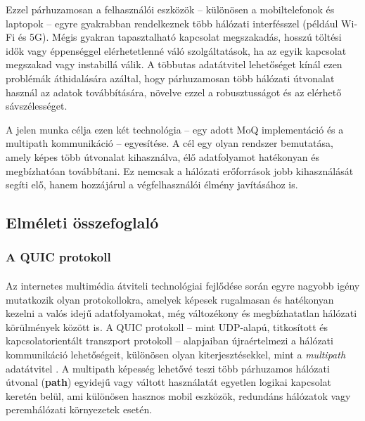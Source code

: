 \documentclass[a4paper,oneside]{article}
\begin{document}
Ezzel párhuzamosan a felhasználói eszközök – különösen a mobiltelefonok és 
laptopok – egyre gyakrabban rendelkeznek több hálózati interfésszel (például Wi-Fi és 5G). 
Mégis gyakran tapasztalható kapcsolat megszakadás, hosszú töltési idők vagy éppenséggel 
elérhetetlenné váló szolgáltatások, ha az egyik kapcsolat megszakad vagy instabillá 
válik. A többutas adatátvitel lehetőséget kínál ezen problémák áthidalására azáltal, 
hogy párhuzamosan több hálózati útvonalat használ az adatok továbbítására, növelve 
ezzel a robusztusságot és az elérhető sávszélességet.

A jelen munka célja ezen két technológia – egy adott MoQ implementáció és a multipath kommunikáció 
– egyesítése. A cél egy olyan rendszer bemutatása, 
amely képes több útvonalat kihasználva, élő adatfolyamot hatékonyan és megbízhatóan 
továbbítani. Ez nemcsak a hálózati erőforrások jobb kihasználását segíti elő, hanem 
hozzájárul a végfelhasználói élmény javításához is.



\subsection{Elméleti összefoglaló}

\subsubsection{A QUIC protokoll}
\paragraph{}
Az internetes multimédia átviteli technológiai fejlődése során egyre 
nagyobb igény mutatkozik olyan protokollokra, amelyek képesek 
rugalmasan és hatékonyan kezelni a valós idejű adatfolyamokat, még 
változékony és megbízhatatlan hálózati körülmények között is. A QUIC 
protokoll\cite{quic} – mint UDP-alapú, titkosított és kapcsolatorientált 
transzport protokoll – alapjaiban újraértelmezi a hálózati kommunikáció 
lehetőségeit, különösen olyan kiterjesztésekkel, mint a \emph{multipath} 
adatátvitel \cite{mp_quic}. A multipath képesség lehetővé teszi több párhuzamos hálózati 
útvonal (\textbf{path}) egyidejű vagy váltott használatát egyetlen logikai kapcsolat keretén 
belül, ami különösen hasznos mobil eszközök, redundáns hálózatok vagy peremhálózati környezetek esetén.
\end{document}
